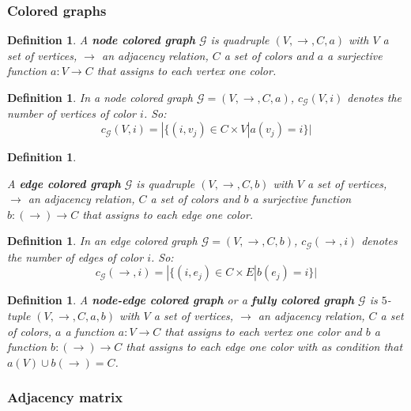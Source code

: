 \documentclass[a4paper,11pt]{report}
\newtheorem{definition}[theorem]{Definition}
\newcommand{\graf}{\mathscr{G}}
\begin{document}
 \subsubsection{Colored graphs}\label{colored}
 \begin{definition}\label{defcolor}
   A \textbf{node colored graph} $\graf$ is quadruple  $(V, \to, C, a)$ with $V$ 
   a set of vertices, $\to$ an adjacency relation, $C$ a set of colors and $a$ 
   a surjective function $a: V \to C$ that assigns to each vertex one color.
 \end{definition}
 \begin{definition}
   In a node colored graph $\graf = (V, \to, C, a) $, $c_\graf(V,i)$ denotes the number of vertices of 
   color $i$. So:
   $$c_\graf(V, i) = |\{(i, v_j) \in C \times V | a(v_j) = i\}|$$
 \end{definition}
 \begin{definition}\label{edgecolored}

   A \textbf{edge colored graph} $\graf$ is quadruple  $(V, \to, C, b)$ with $V$ 
   a set of vertices, $\to$ an adjacency relation, $C$ a set of colors and $b$ 
   a surjective function $b: (\to) \to C$ that assigns to each edge one color.
 \end{definition}
 \begin{definition}
   In an edge colored graph $\graf = (V, \to, C, b) $, $c_\graf(\to,i)$ denotes the number of edges of 
   color $i$. So:
   $$c_\graf(\to, i) = |\{(i, e_j) \in C \times E | b(e_j) = i\}|$$
 \end{definition}
  \begin{definition}\label{fullcolored}
   A \textbf{node-edge colored graph} or a \textbf{fully colored graph} $\graf$ is $5$-tuple  $(V, \to, C, a, b)$ with $V$ 
   a set of vertices, $\to$ an adjacency relation, $C$ a set of colors,  $a$ 
   a function $a: V \to C$ that assigns to each vertex one color and $b$ 
   a function $b: (\to) \to C$ that assigns to each edge one color with as 
   condition that $a(V) \cup b(\to) = C$.
 \end{definition}

 \subsubsection{Adjacency matrix}
\end{document}
